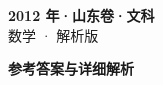 \documentclass[zihao=-4, a4paper]{ctexart}
\begin{document}
\begin{center}
  {\Large\bfseries 2012 年·山东卷·文科}\\[4pt]
  {\large 数学 · 解析版}
\end{center}
\medskip
{}

\clearpage
{}
\begin{center}{\Large\bfseries 参考答案与详细解析}\end{center}
\medskip

\end{document}

